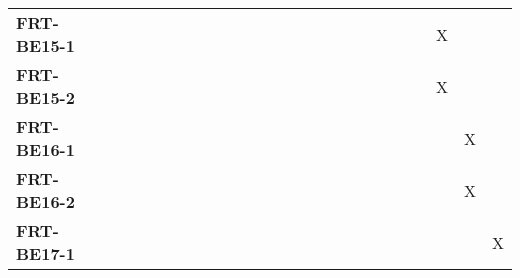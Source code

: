 \documentclass[12pt, titlepage]{article}
\begin{document}
\begin{landscape}
\begin{longtable}{|l|ccccccccccccccccc|}
		\textbf{FRT-BE15-1} & ~                                                         & ~            & ~            & ~            & ~            & ~            & ~            & ~            & ~            & ~             & ~             & ~             & ~             & ~             & X             & ~             & ~             \\
		\textbf{FRT-BE15-2} & ~                                                         & ~            & ~            & ~            & ~            & ~            & ~            & ~            & ~            & ~             & ~             & ~             & ~             & ~             & X             & ~             & ~             \\
		\textbf{FRT-BE16-1} & ~                                                         & ~            & ~            & ~            & ~            & ~            & ~            & ~            & ~            & ~             & ~             & ~             & ~             & ~             & ~             & X             & ~             \\
		\textbf{FRT-BE16-2} & ~                                                         & ~            & ~            & ~            & ~            & ~            & ~            & ~            & ~            & ~             & ~             & ~             & ~             & ~             & ~             & X             & ~             \\
		\textbf{FRT-BE17-1} & ~                                                         & ~            & ~            & ~            & ~            & ~            & ~            & ~            & ~            & ~             & ~             & ~             & ~             & ~             & ~             & ~             & X             \\
		\hline
	\end{longtable}

	\newpage


\end{landscape}
\end{document}

